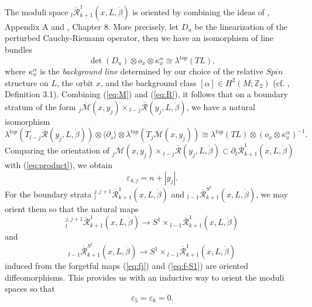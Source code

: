 \documentclass[a4paper]{article}
\numberwithin{equation}{section}
\begin{document}
The moduli space ${}_l\overline{\mathcal{R}}_{k+1}^1(x,L,\ring{\beta})$ is oriented by combining the ideas of \cite{ma}, Appendix A and \cite{fooo1}, Chapter 8. More precisely, let $D_u$ be the linearization of the perturbed Cauchy-Riemann operator, then we have an isomorphism of line bundles
\begin{equation}\label{eq:R}
\det(D_u)\otimes o_x\otimes\kappa_x^\alpha\cong\lambda^{\mathit{top}}(\mathit{TL}),
\end{equation}
where $\kappa_x^\alpha$ is the \textit{background line} determined by our choice of the relative $\mathit{Spin}$ structure on $L$, the orbit $x$, and the background class $[\alpha]\in H^2(M;\mathbb{Z}_2)$ (cf. \cite{ma}, Definition 3.1). Combining (\ref{eq:M}) and (\ref{eq:R}), it follows that on a boundary stratum of the form ${}_j\overline{\mathcal{M}}(x,y_j)\times{}_{l-j}\overline{\mathcal{R}}(y_j,L,\ring{\beta})$, we have a natural isomorphism
\begin{equation}\label{eq:product}
\lambda^\mathit{top}\left(T{}_{l-j}\overline{\mathcal{R}}(y_j,L,\ring{\beta})\right)\otimes\langle\partial_s\rangle\otimes\lambda^\mathit{top}\left(T{}_j\overline{\mathcal{M}}(x,y_j)\right)\cong\lambda^\mathit{top}(\mathit{TL})\otimes(o_x\otimes\kappa_x^\alpha)^{-1}.
\end{equation}
Comparing the orientation of ${}_j\overline{\mathcal{M}}(x,y_j)\times{}_{l-j}\overline{\mathcal{R}}(y_j,L,\ring{\beta})\subset\partial{}_l\overline{\mathcal{R}}_{k+1}^1(x,L,\ring{\beta})$ with (\ref{eq:product}), we obtain
\begin{equation}
\varepsilon_{4,j}=n+|y_j|.
\end{equation}
For the boundary strata ${}_l^{j,j+1}\overline{\mathcal{R}}_{k+1}^1(x,L,\ring{\beta})$ and ${}_{l-1}\overline{\mathcal{R}}_{k+1}^{S^1}(x,L,\ring{\beta})$, we may orient them so that the natural maps
\begin{equation}
{}_l^{j,j+1}\overline{\mathcal{R}}_{k+1}^1(x,L,\ring{\beta})\rightarrow S^1\times{}_{l-1}\overline{\mathcal{R}}_{k+1}^1(x,L,\ring{\beta})
\end{equation}
and
\begin{equation}
{}_{l-1}\overline{\mathcal{R}}_{k+1}^{S^1}(x,L,\ring{\beta})\rightarrow S^1\times{}_{l-1}\overline{\mathcal{R}}_{k+1}^1(x,L,\ring{\beta})
\end{equation}
induced from the forgetful maps (\ref{eq:fj}) and (\ref{eq:f-S1}) are oriented diffeomorphisms. This provides us with an inductive way to orient the moduli spaces so that
\begin{equation}
\varepsilon_5=\varepsilon_6=0.
\end{equation}
\end{document}
